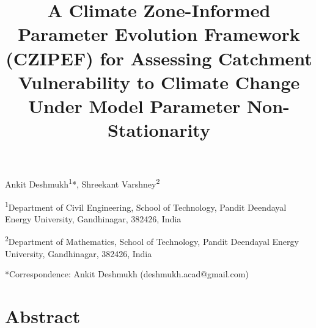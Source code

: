 \documentclass[
]{article}
\title{A Climate Zone-Informed Parameter Evolution Framework (CZIPEF)
for Assessing Catchment Vulnerability to Climate Change Under Model
Parameter Non-Stationarity}
\author{}
\date{}
\begin{document}
\maketitle

Ankit Deshmukh\textsuperscript{1}*, Shreekant
Varshney\textsuperscript{2}

\textsuperscript{1}Department of Civil Engineering, School of
Technology, Pandit Deendayal Energy University, Gandhinagar, 382426,
India

\textsuperscript{2}Department of Mathematics, School of Technology,
Pandit Deendayal Energy University, Gandhinagar, 382426, India

*Correspondence: Ankit Deshmukh (deshmukh.acad@gmail.com)

\section{Abstract}\label{abstract}
\end{document}
